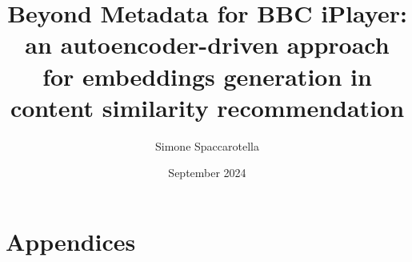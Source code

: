 \documentclass[12pt,a4paper]{article}
\begin{document}
\title{Beyond Metadata for BBC iPlayer:\\an autoencoder-driven approach for embeddings generation in content similarity recommendation}
\author{Simone Spaccarotella}
\date{September 2024}

\maketitle
\tableofcontents

















\section{Appendices}



\end{document}
